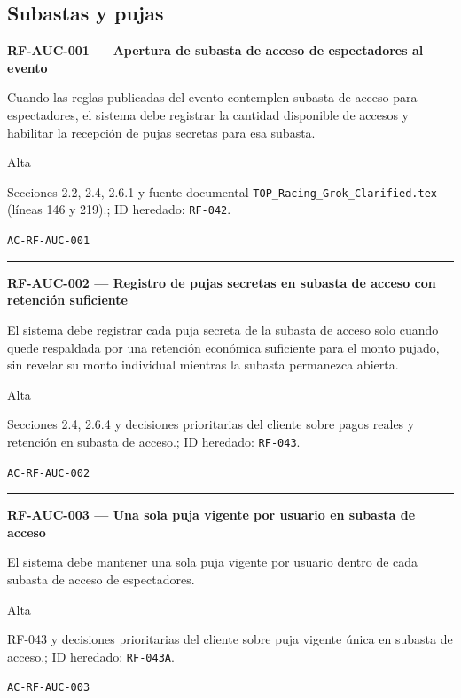 \documentclass[10pt,letterpaper]{article}
\begin{document}
\subsection{Subastas y pujas}
\noindent\textbf{RF-AUC-001 --- Apertura de subasta de acceso de espectadores al evento}\par
\begin{description}[style=nextline,leftmargin=3.15cm,labelwidth=2.8cm,font=\normalfont\bfseries]
\item[Obligación] Cuando las reglas publicadas del evento contemplen subasta de acceso para espectadores, el sistema debe registrar la cantidad disponible de accesos y habilitar la recepción de pujas secretas para esa subasta.
\item[Prioridad] Alta
\item[Procedencia] Secciones 2.2, 2.4, 2.6.1 y fuente documental \texttt{TOP\_Racing\_Grok\_Clarified.tex} (líneas 146 y 219).; ID heredado: \texttt{RF-042}.
\item[Verificación] \texttt{AC-RF-AUC-001}
\end{description}
\vspace{0.25em}\hrule\vspace{0.65em}
\noindent\textbf{RF-AUC-002 --- Registro de pujas secretas en subasta de acceso con retención suficiente}\par
\begin{description}[style=nextline,leftmargin=3.15cm,labelwidth=2.8cm,font=\normalfont\bfseries]
\item[Obligación] El sistema debe registrar cada puja secreta de la subasta de acceso solo cuando quede respaldada por una retención económica suficiente para el monto pujado, sin revelar su monto individual mientras la subasta permanezca abierta.
\item[Prioridad] Alta
\item[Procedencia] Secciones 2.4, 2.6.4 y decisiones prioritarias del cliente sobre pagos reales y retención en subasta de acceso.; ID heredado: \texttt{RF-043}.
\item[Verificación] \texttt{AC-RF-AUC-002}
\end{description}
\vspace{0.25em}\hrule\vspace{0.65em}
\noindent\textbf{RF-AUC-003 --- Una sola puja vigente por usuario en subasta de acceso}\par
\begin{description}[style=nextline,leftmargin=3.15cm,labelwidth=2.8cm,font=\normalfont\bfseries]
\item[Obligación] El sistema debe mantener una sola puja vigente por usuario dentro de cada subasta de acceso de espectadores.
\item[Prioridad] Alta
\item[Procedencia] RF-043 y decisiones prioritarias del cliente sobre puja vigente única en subasta de acceso.; ID heredado: \texttt{RF-043A}.
\item[Verificación] \texttt{AC-RF-AUC-003}
\end{description}
\end{document}
